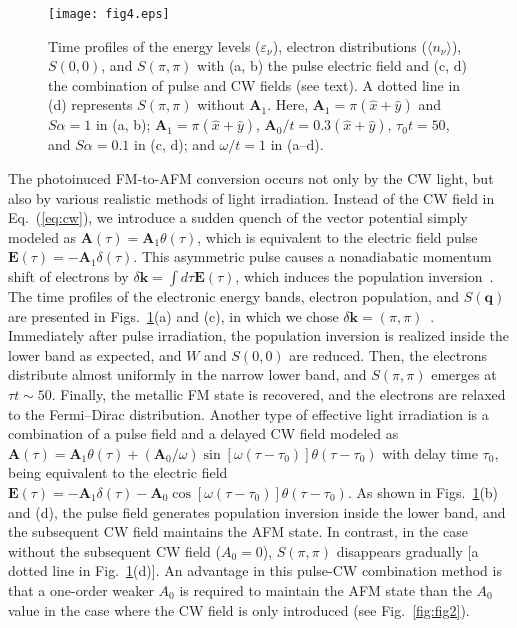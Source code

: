 \documentclass[aps,twocolumn,showpacs,prl,amsmath,amssymb]{revtex4-1}
\begin{document}
\begin{figure}[t]
\begin{center}
\texttt{[image: fig4.eps]}
\end{center}
\caption{
Time profiles of the energy levels ($\varepsilon_\nu$), electron distributions ($\langle n_\nu \rangle$), $S(0, 0)$, and $S(\pi, \pi )$ with 
(a, b) the pulse electric field
and 
(c, d) the combination of pulse and CW fields (see text).
A dotted line in (d) represents $S(\pi, \pi)$ without $\bm{A}_1$. 
%
Here, $\bm{A}_1=\pi(\hat{x}+\hat{y})$ and $S\alpha=1$ in (a, b); $\bm{A}_1=\pi(\hat{x}+\hat{y})$, $\bm{A}_0/t=0.3(\hat{x}+\hat{y})$, $\tau_0 t=50$, and $S\alpha=0.1$ in (c, d); and $\omega/t=1$ in (a--d). 
}
\label{fig:fig4}
\end{figure}
%
The photoinuced FM-to-AFM conversion occurs not only by the CW light, but also 
by various realistic methods of light irradiation. 
Instead of the CW field in Eq.~(\ref{eq:cw}), we introduce a sudden quench of the vector potential simply modeled as $\bm{A}(\tau)=\bm{A}_1 \theta(\tau)$, 
which is equivalent to the electric field pulse $\bm{E}(\tau)=-\bm{A}_1 \delta(\tau)$. 
This asymmetric pulse causes a nonadiabatic momentum shift of electrons by $\delta\bm{k}=\int d\tau \bm{E}(\tau)$, which induces the population inversion~\cite{tsuji}. 
The time profiles of the electronic energy bands, electron population, and $S(\bm{q})$ are presented in Figs.~\ref{fig:fig4}(a) and (c), in which we chose $\delta\bm{k}=(\pi, \pi)$~\cite{ampli}. 
Immediately after pulse irradiation, the population inversion is realized inside the lower band as expected, 
and $W$ and $S(0, 0)$ are reduced. 
Then, the electrons distribute almost uniformly in the narrow lower band, and $S(\pi, \pi)$ emerges at $\tau t\sim 50$. 
Finally, the metallic FM state is recovered, and the electrons are relaxed to the Fermi--Dirac distribution. 
%
Another type of effective light irradiation is a combination of a pulse field and a delayed CW field modeled as 
$\bm{A}(\tau)=\bm{A}_1 \theta(\tau)+(\bm{A}_{0}/\omega)\sin[\omega (\tau-\tau_0)]\theta(\tau-\tau_0)$ with delay time $\tau_0$, being equivalent to the electric field 
$\bm{E}(\tau)=-\bm{A}_1 \delta(\tau)-\bm{A}_{0}\cos[\omega (\tau-\tau_0)]\theta(\tau-\tau_0)$. 
As shown in Figs.~\ref{fig:fig4}(b) and (d), the pulse field generates population inversion inside the lower band, and the subsequent CW field maintains the AFM state. 
In contrast, in the case without the subsequent CW field ($A_0=0$), $S(\pi, \pi)$ disappears gradually [a dotted line in Fig.~\ref{fig:fig4}(d)]. 
%
An advantage in this pulse-CW combination method is that 
a one-order weaker $A_0$ is required to maintain the AFM state than the $A_0$ value in the case where the CW field is only introduced (see Fig.~\ref{fig:fig2}). 
\end{document}
